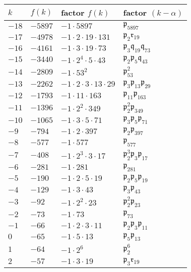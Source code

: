 \documentclass{article}
\newcommand{\pid}{\mathfrak{p}}
\newcommand{\qid}{\mathfrak{q}}
\begin{document}
\begin{tabular}{|l|l|l|l|} \hline
  $k$ & $f(k)$ & factor $f(k)$ & factor $(k-\alpha)$ \\ \hline \hline
  $-18$ & $-5897$ & $-1 \cdot 5897$ & $\pid_{5897}$ \\ \hline
  $-17$ & $-4978$ & $-1 \cdot 2 \cdot 19 \cdot 131$ & $\pid_2\mathfrak{r}_{19}$ \\ \hline
  $-16$ & $-4161$ & $-1 \cdot 3 \cdot 19 \cdot 73$ & $\pid_3\qid_{19}\qid_{73}$ \\ \hline
  $-15$ & $-3440$ & $-1 \cdot 2^{4} \cdot 5 \cdot 43$ & $\pid_2\pid_5\qid_{43}$ \\ \hline
  $-14$ & $-2809$ & $-1 \cdot 53^{2}$ & $\pid_{53}^2$ \\ \hline
  $-13$ & $-2262$ & $-1 \cdot 2 \cdot 3 \cdot 13 \cdot 29$ & $\pid_3\pid_{13}\pid_{29}$ \\ \hline
  $-12$ & $-1793$ & $-1 \cdot 11 \cdot 163$ & $\pid_{11}\pid_{163}$ \\ \hline
  $-11$ & $-1396$ & $-1 \cdot 2^{2} \cdot 349$ & $\pid_2^2\pid_{349}$ \\ \hline
  $-10$ & $-1065$ & $-1 \cdot 3 \cdot 5 \cdot 71$ & $\pid_3\pid_5\pid_{71}$ \\ \hline
  $-9$ & $-794$ & $-1 \cdot 2 \cdot 397$ & $\pid_2\pid_{397}$ \\ \hline
  $-8$ & $-577$ & $-1 \cdot 577$ & $\pid_{577}$\\ \hline
  $-7$ & $-408$ & $-1 \cdot 2^{3} \cdot 3 \cdot 17$ & $\pid_2^3\pid_3\pid_{17}$ \\ \hline
  $-6$ & $-281$ & $-1 \cdot 281$ & $\pid_{281}$ \\ \hline
  $-5$ & $-190$ & $-1 \cdot 2 \cdot 5 \cdot 19$ & $\pid_2\pid_5\pid_{19}$ \\ \hline
  $-4$ & $-129$ & $-1 \cdot 3 \cdot 43$ & $\pid_3\pid_{43}$ \\ \hline
  $-3$ & $-92$ & $-1 \cdot 2^{2} \cdot 23$ & $\pid_2^2\pid_{23}$ \\ \hline
  $-2$ & $-73$ & $-1 \cdot 73$ & $\pid_{73}$\\ \hline
  $-1$ & $-66$ & $-1 \cdot 2 \cdot 3 \cdot 11$ & $\pid_2\pid_3\pid_{11}$ \\ \hline
  $0$ & $-65$ & $-1 \cdot 5 \cdot 13$ & $\pid_5\pid_{13}$ \\ \hline
  $1$ & $-64$ & $-1 \cdot 2^{6}$ & $\pid_2^6$ \\ \hline
  $2$ & $-57$ & $-1 \cdot 3 \cdot 19$ & $\pid_3\mathfrak{r}_{19}$ \\ \hline

\end{tabular}
\end{document}
